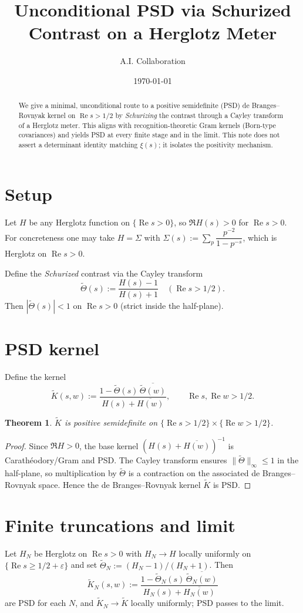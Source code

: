 \documentclass[11pt]{article}
\title{Unconditional PSD via Schurized Contrast on a Herglotz Meter}
\author{A.I. Collaboration}
\date{\today}
\newcommand{\ReS}{\operatorname{Re}}
\newcommand{\Si}{\Sigma}
\newcommand{\HN}{H_N}
\newcommand{\Th}{\Theta}
\theoremstyle{plain}
\newtheorem{theorem}{Theorem}
\theoremstyle{remark}
\begin{document}
\maketitle

\begin{abstract}
We give a minimal, unconditional route to a positive semidefinite (PSD) de Branges--Rovnyak kernel on $\ReS s>1/2$ by \emph{Schurizing} the contrast through a Cayley transform of a Herglotz meter. This aligns with recognition-theoretic Gram kernels (Born-type covariances) and yields PSD at every finite stage and in the limit. This note does not assert a determinant identity matching $\xi(s)$; it isolates the positivity mechanism.
\end{abstract}

\section{Setup}
Let $H$ be any Herglotz function on $\{\ReS s>0\}$, so $\Re H(s)>0$ for $\ReS s>0$. For concreteness one may take $H=\Si$ with $\Si(s):=\sum_p \dfrac{p^{-2}}{1-p^{-s}}$, which is Herglotz on $\ReS s>0$.

Define the \emph{Schurized} contrast via the Cayley transform
\[
\widetilde{\Th}(s):=\frac{H(s)-1}{H(s)+1} \quad (\ReS s>1/2).
\]
Then $|\widetilde{\Th}(s)|<1$ on $\ReS s>0$ (strict inside the half-plane).

\section{PSD kernel}
Define the kernel
\[
\widetilde{K}(s,w):=\frac{1-\widetilde{\Th}(s)\,\overline{\widetilde{\Th}(w)}}{H(s)+\overline{H(w)}},\qquad \ReS s,\ReS w>1/2.
\]
\begin{theorem}
$\widetilde{K}$ is positive semidefinite on $\{\ReS s>1/2\}\times\{\ReS w>1/2\}$.
\end{theorem}
\begin{proof}
Since $\Re H>0$, the base kernel $(H(s)+\overline{H(w)})^{-1}$ is Carath\'eodory/Gram and PSD. The Cayley transform ensures $\|\widetilde{\Th}\|_{\infty}\le 1$ in the half-plane, so multiplication by $\widetilde{\Th}$ is a contraction on the associated de Branges--Rovnyak space. Hence the de Branges--Rovnyak kernel $\widetilde{K}$ is PSD.
\end{proof}

\section{Finite truncations and limit}
Let $\HN$ be Herglotz on $\ReS s>0$ with $\HN\to H$ locally uniformly on $\{\ReS s\ge 1/2+\varepsilon\}$ and set $\widetilde{\Th}_N:=(\HN-1)/(\HN+1)$. Then
\[
\widetilde{K}_N(s,w):=\frac{1-\widetilde{\Th}_N(s)\,\overline{\widetilde{\Th}_N(w)}}{\HN(s)+\overline{\HN(w)}}
\]
are PSD for each $N$, and $\widetilde{K}_N\to\widetilde{K}$ locally uniformly; PSD passes to the limit.
\end{document}
